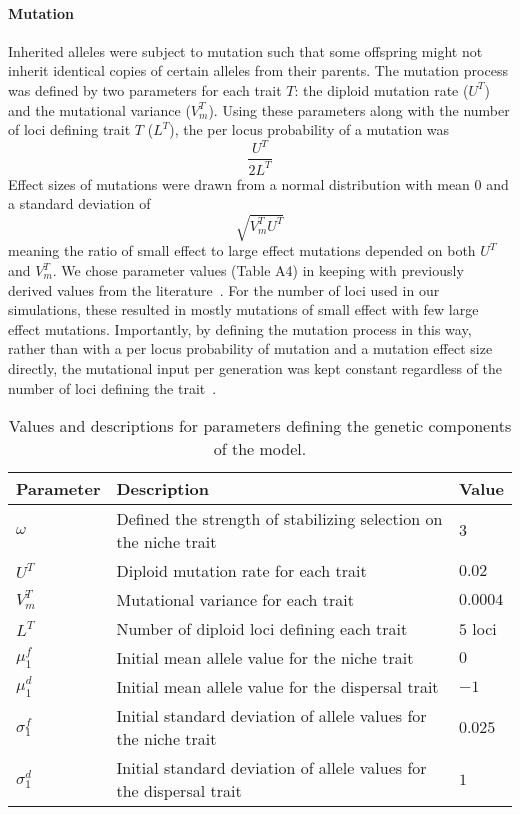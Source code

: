 \documentclass[11pt]{article}
\begin{document}
\paragraph{Mutation}
Inherited alleles were subject to mutation such that some offspring might not inherit identical copies of certain alleles from their parents. The mutation process was defined by two parameters for each trait $T$: the diploid mutation rate ($U^{T}$) and the mutational variance ($V_{m}^{T}$). Using these parameters along with the number of loci defining trait $T$ ($L^{T}$), the per locus probability of a mutation was
\begin{equation}
\frac{U^{T}}{2L^{T}}
\end{equation}
Effect sizes of mutations were drawn from a normal distribution with mean $0$ and a standard deviation of
\begin{equation}
\sqrt{V_{m}^{T}U^{T}}
\end{equation}
meaning the ratio of small effect to large effect mutations depended on both $U^{T}$ and $V_{m}^{T}$. We chose parameter values (Table A4) in keeping with previously derived values from the literature~\citep{gilbert2017local}. For the number of loci used in our simulations, these resulted in mostly mutations of small effect with few large effect mutations. Importantly, by defining the mutation process in this way, rather than with a per locus probability of mutation and a mutation effect size directly, the mutational input per generation was kept constant regardless of the number of loci defining the trait~\citep{schiffers2014landscape}.

\begin{table}
\renewcommand{\arraystretch}{1.5}
  \begin{tabular}{ p{2cm} | p{8cm} | p{2cm} }
    \hline
    Parameter & Description & Value \\ \hline \hline
    $\omega$ & Defined the strength of stabilizing selection on the niche trait & $3$ \\
    $U^{T}$ & Diploid mutation rate for each trait & $0.02$ \\
    $V_{m}^{T}$ & Mutational variance for each trait & $0.0004$ \\
    $L^{T}$ & Number of diploid loci defining each trait & $5$ loci \\
    $\mu_{1}^{f}$ & Initial mean allele value for the niche trait & $0$ \\
    $\mu_{1}^{d}$ & Initial mean allele value for the dispersal trait & $-1$ \\
    $\sigma_{1}^{f}$ & Initial standard deviation of allele values for the niche trait & $0.025$ \\
    $\sigma_{1}^{d}$ & Initial standard deviation of allele values for the dispersal trait & $1$ \\
    \hline
  \end{tabular}
\caption[LoF entry]{Values and descriptions for parameters defining the genetic components of the model.}
\label{table:GenPars}
\end{table}
\end{document}
